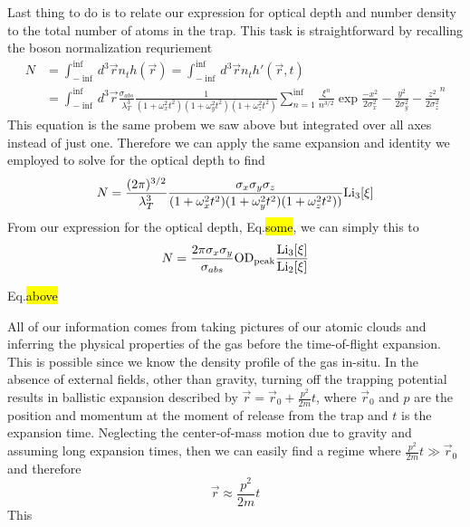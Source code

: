 Last thing to do is to relate our expression for optical depth and number density to the total number of atoms in the trap. This task is straightforward by recalling the boson normalization requriement
\begin{equation}
\begin{split}
N&=\int_{-\inf}^{\inf} d^3\vec{r} n_th(\vec{r}) = \int_{-\inf}^{\inf} d^3\vec{r} n_th'(\vec{r},t) \\
&=\int_{-\inf}^{\inf} d^3\vec{r} \frac{\sigma_{abs}}{\lambda_T^3}\frac{1}{(1+\omega_x^2t^2)(1+\omega_y^2t^2)(1+\omega_z^2t^2)} \sum_{n=1}^{\inf} \frac{\xi^n}{n^{3/2}} \exp{\frac{-x^2}{2\sigma_x^2} - \frac{y^2}{2\sigma_y^2} - \frac{z^2}{2\sigma_z^2}}^n
\end{split}
\end{equation}
This equation is the same probem we saw above but integrated over all axes instead of just one. Therefore we can apply the same expansion and identity we employed to solve for the optical depth to find
\begin{equation}
N=\frac{(2\pi)^{3/2}}{\lambda_T^3} \frac{\sigma_x \sigma_y \sigma_z}{(1+\omega_x^2t^2)(1+\omega_y^2t^2)(1+\omega_z^2t^2))}\text{Li}_{3}\!\left[ \xi \right]
\end{equation}
From our expression for the optical depth, Eq.\hl{some}, we can simply this to
\begin{equation}
N=\frac{2\pi\sigma_x\sigma_y}{\sigma_{abs}}\text{OD}_{\text{peak}}\frac{\text{Li}_{3}\!\left[ \xi \right]}{\text{Li}_{2}\!\left[ \xi \right]}
\end{equation}

Eq.\hl{above} 


All of our information comes from taking pictures of our atomic clouds and inferring the physical properties of the gas before the time-of-flight expansion. This is possible since we know the density profile of the gas in-situ. In the absence of external fields, other than gravity, turning off the trapping potential results in ballistic expansion described by $\vec{r} = \vec{r}_0 + \frac{p^2}{2m}t$, where $\vec{r}_0$ and $p$ are the position and momentum at the moment of release from the trap and $t$ is the expansion time. Neglecting the center-of-mass motion due to gravity and assuming long expansion times, then we can easily find a regime where $\frac{p^2}{2m}t \gg \vec{r}_0$ and therefore
	\begin{equation}
		\vec{r} \approx \frac{p^2}{2m}t
	\end{equation}
This 





